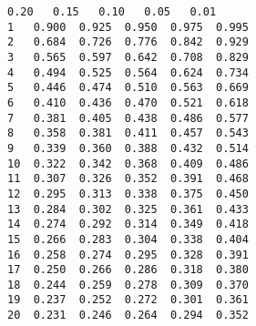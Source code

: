 \documentclass[11pt]{article}
\makeatletter
\newcommand{\boxspacing}{\kern\kvtcb@left@rule\kern\kvtcb@boxsep}
\newcommand{\prompt}[4]{
        {\ttfamily\llap{{\color{#2}[#3]:\hspace{3pt}#4}}\vspace{-\baselineskip}}
    }
\makeatother
\begin{document}
            \begin{tcolorbox}[breakable, size=fbox, boxrule=.5pt, pad at break*=1mm, opacityfill=0]
\prompt{Out}{outcolor}{ }{\boxspacing}
\begin{Verbatim}[commandchars=\\\{\}]
     0.20   0.15   0.10   0.05   0.01
1   0.900  0.925  0.950  0.975  0.995
2   0.684  0.726  0.776  0.842  0.929
3   0.565  0.597  0.642  0.708  0.829
4   0.494  0.525  0.564  0.624  0.734
5   0.446  0.474  0.510  0.563  0.669
6   0.410  0.436  0.470  0.521  0.618
7   0.381  0.405  0.438  0.486  0.577
8   0.358  0.381  0.411  0.457  0.543
9   0.339  0.360  0.388  0.432  0.514
10  0.322  0.342  0.368  0.409  0.486
11  0.307  0.326  0.352  0.391  0.468
12  0.295  0.313  0.338  0.375  0.450
13  0.284  0.302  0.325  0.361  0.433
14  0.274  0.292  0.314  0.349  0.418
15  0.266  0.283  0.304  0.338  0.404
16  0.258  0.274  0.295  0.328  0.391
17  0.250  0.266  0.286  0.318  0.380
18  0.244  0.259  0.278  0.309  0.370
19  0.237  0.252  0.272  0.301  0.361
20  0.231  0.246  0.264  0.294  0.352
\end{Verbatim}
\end{tcolorbox}
        
\end{document}
